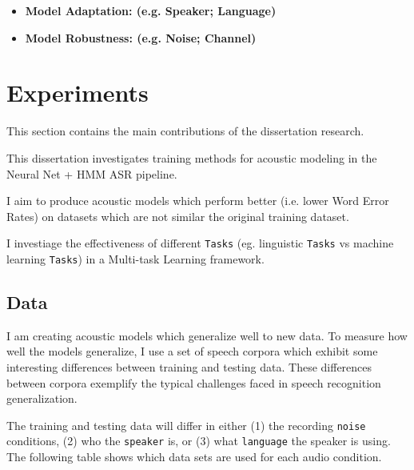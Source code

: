 \documentclass[10pt,a4paper]{article}
\begin{document}
\begin{itemize}

\item \textbf{Model Adaptation: (e.g. Speaker; Language)}

    
  
\item \textbf{Model Robustness: (e.g. Noise; Channel)}

  
\end{itemize}



\newpage

\section{Experiments}

This section contains the main contributions of the dissertation research.

This dissertation investigates training methods for acoustic modeling in the Neural Net + HMM ASR pipeline.

I aim to produce acoustic models which perform better (i.e. lower Word Error Rates) on datasets which are not similar the original training dataset.

I investiage the effectiveness of different \texttt{Tasks} (eg. linguistic \texttt{Tasks} vs machine learning \texttt{Tasks}) in a Multi-task Learning framework.


\subsection{Data}

I am creating acoustic models which generalize well to new data. To measure how well the models generalize, I use a set of speech corpora which exhibit some interesting differences between training and testing data. These differences between corpora exemplify the typical challenges faced in speech recognition generalization.

The training and testing data will differ in either (1) the recording \texttt{noise} conditions, (2) who the \texttt{speaker} is, or (3) what \texttt{language} the speaker is using. The following table shows which data sets are used for each audio condition.
\end{document}
